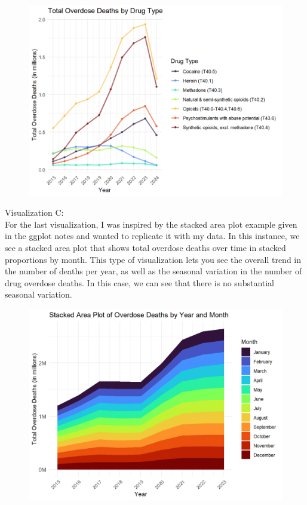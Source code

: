 \documentclass{article}
\begin{document}
\begin{figure}[H]
    \centering
    \includegraphics[width=1\linewidth]{PS6b_Hunt.png}
    \label{fig:enter-label}
    \end{figure}
\noindent Visualization C:
\\For the last visualization, I was inspired by the stacked area plot example given in the ggplot notes and wanted to replicate it with my data. In this instance, we see a stacked area plot that shows total overdose deaths over time in stacked proportions by month. This type of visualization lets you see the overall trend in the number of deaths per year, as well as the seasonal variation in the number of drug overdose deaths. In this case, we can see that there is no substantial seasonal variation. 
\begin{figure}[H]
    \centering
    \includegraphics[width=1\linewidth]{PS6c_Hunt.png}
    \label{fig:enter-label}
    \end{figure}
\end{document}
